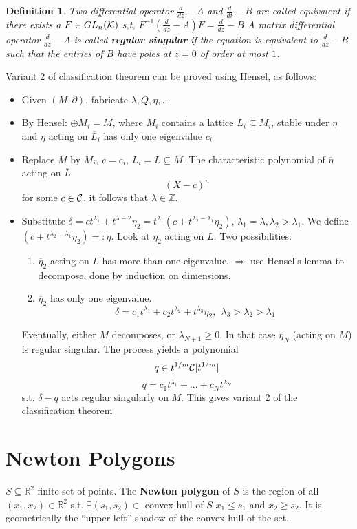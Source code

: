 \documentclass[11pt]{article}
\newtheorem{dfn}[thm]{Definition}
\newcommand{\pd}{\partial}
\newcommand{\reals}{\mathbb R}
\newcommand{\intg}{\mathbb Z}
\newcommand{\calc}{{\cal C}}
\newcommand{\calk}{{\cal K}}
\newcommand{\Lrta}{\Longrightarrow}
\begin{document}
\begin{dfn}
Two differential operator $\frac{d}{dz}-A$ and $\frac{d}{dt}-B$ are called equivalent if there exists a $F\in GL_n(\calk)$ s,t, $F^{-1}(\frac{d}{dz}-A)F=\frac{d}{dz}-B$
A matrix differential operator $\frac{d}{dz}-A$ is called \textbf{regular singular} if the equation is equivalent to $\frac{d}{dz}-B$ such that the entries of $B$ have poles at $z=0$ of order at most $1$.
\end{dfn}
Variant 2 of classification theorem can be proved using Hensel, as  follows:
\begin{itemize}
\item Given $(M,\pd)$, fabricate $\lambda,Q,\eta,...$
\item By Hensel: $\oplus M_i=M$, where $M_i$ contains a lattice $L_i\subseteq M_i$, stable under $\eta$ and $\overline{\eta}$ acting on $\overline{L}_i$ has only one eigenvalue $c_i$
\item Replace $M$ by $M_i$, $c=c_i$, $L_i=L\subseteq M$. The characteristic polynomial of $\overline{\eta}$ acting on $\overline{L}$
$$
(X-c)^n
$$
for some $c\in\calc$, it follows that $\lambda\in \intg$.
\item Substitute $\delta=c t^{\lambda_1}+t^{\lambda-2}\eta_2=t^{\lambda_1}(c+t^{\lambda_2-\lambda_1}\eta_2)$, $\lambda_1=\lambda, \lambda_2>\lambda_1$. We define $(c+t^{\lambda_2-\lambda_1}\eta_2)=:\eta$. Look at $\eta_2$ acting on $L$. Two possibilities:
\begin{enumerate}
\item $\overline{\eta}_2$ acting on $\overline{L}$ has more than one eigenvalue. $\Lrta$ use Hensel's lemma to decompose, done by induction on dimensions.
\item $\overline{\eta}_2$ has only one eigenvalue.
$$
\delta=c_1 t^{\lambda_1}+c_2 t^{\lambda_2}+t^{\lambda_3}\eta_2, \ \ \lambda_3>\lambda_2>\lambda_1
$$
\end{enumerate}
Eventually, either $M$ decomposes, or $\lambda_{N+1}\geq 0$, In that case $\eta_N$ (acting on $M$) is regular singular. The process yields a polynomial
$$
q\in t^{1/m}\calc[t^{1/m}]
$$
$$
q=c_1 t^{\lambda_1}+...+c_N t^{\lambda_N}
$$
s.t. $\delta-q$ acts regular singularly on $M$. This gives variant 2 of the classification theorem
\end{itemize}

\section{Newton Polygons}
$S\subseteq \reals^2$ finite set of points. The \textbf{Newton polygon} of $S$ is the region of all $(x_1,x_2)\in\reals^2$ s.t. $\exists (s_1, s_2)\in$ convex hull of $S$ $x_1\leq s_1$ and $ x_2\geq s_2$. It is geometrically 
the ``upper-left'' shadow of the convex hull of the set.
\end{document}
